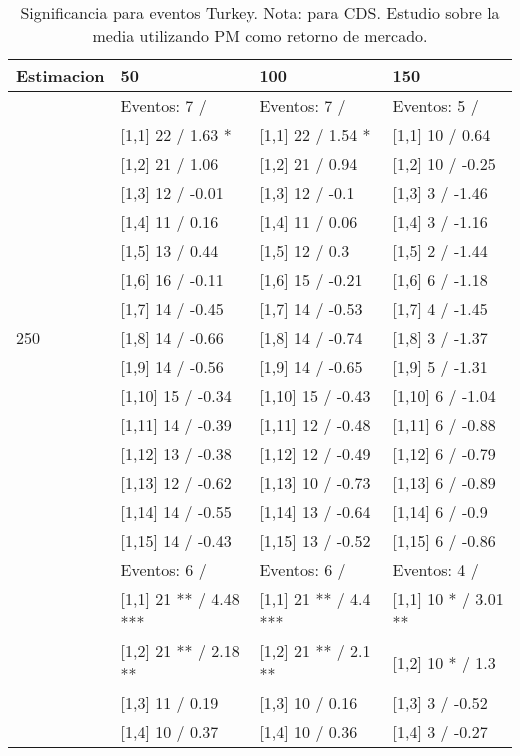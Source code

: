 \begin{table}

\caption{Significancia para eventos Turkey. Nota: para CDS. Estudio sobre la media utilizando PM como retorno de mercado.}
\centering
\begin{tabular}[t]{llll}
\toprule
Estimacion & 50 & 100 & 150\\
\midrule
 & Eventos:  7 / & Eventos:  7 / & Eventos:  5 /\\
 & {}[1,1] 22  / 1.63 * & {}[1,1] 22  / 1.54 * & {}[1,1] 10  / 0.64\\
 & {}[1,2] 21  / 1.06 & {}[1,2] 21  / 0.94 & {}[1,2] 10  / -0.25\\
 & {}[1,3] 12  / -0.01 & {}[1,3] 12  / -0.1 & {}[1,3] 3  / -1.46\\
 & {}[1,4] 11  / 0.16 & {}[1,4] 11  / 0.06 & {}[1,4] 3  / -1.16\\
\addlinespace
 & {}[1,5] 13  / 0.44 & {}[1,5] 12  / 0.3 & {}[1,5] 2  / -1.44\\
 & {}[1,6] 16  / -0.11 & {}[1,6] 15  / -0.21 & {}[1,6] 6  / -1.18\\
 & {}[1,7] 14  / -0.45 & {}[1,7] 14  / -0.53 & {}[1,7] 4  / -1.45\\
250 & {}[1,8] 14  / -0.66 & {}[1,8] 14  / -0.74 & {}[1,8] 3  / -1.37\\
 & {}[1,9] 14  / -0.56 & {}[1,9] 14  / -0.65 & {}[1,9] 5  / -1.31\\
\addlinespace
 & {}[1,10] 15  / -0.34 & {}[1,10] 15  / -0.43 & {}[1,10] 6  / -1.04\\
 & {}[1,11] 14  / -0.39 & {}[1,11] 12  / -0.48 & {}[1,11] 6  / -0.88\\
 & {}[1,12] 13  / -0.38 & {}[1,12] 12  / -0.49 & {}[1,12] 6  / -0.79\\
 & {}[1,13] 12  / -0.62 & {}[1,13] 10  / -0.73 & {}[1,13] 6  / -0.89\\
 & {}[1,14] 14  / -0.55 & {}[1,14] 13  / -0.64 & {}[1,14] 6  / -0.9\\
\addlinespace
 & {}[1,15] 14  / -0.43 & {}[1,15] 13  / -0.52 & {}[1,15] 6  / -0.86\\
 & Eventos:  6 / & Eventos:  6 / & Eventos:  4 /\\
 & {}[1,1] 21 ** / 4.48 *** & {}[1,1] 21 ** / 4.4 *** & {}[1,1] 10 * / 3.01 **\\
 & {}[1,2] 21 ** / 2.18 ** & {}[1,2] 21 ** / 2.1 ** & {}[1,2] 10 * / 1.3\\
 & {}[1,3] 11  / 0.19 & {}[1,3] 10  / 0.16 & {}[1,3] 3  / -0.52\\
\addlinespace
 & {}[1,4] 10  / 0.37 & {}[1,4] 10  / 0.36 & {}[1,4] 3  / -0.27\\

\end{tabular}
\end{table}
